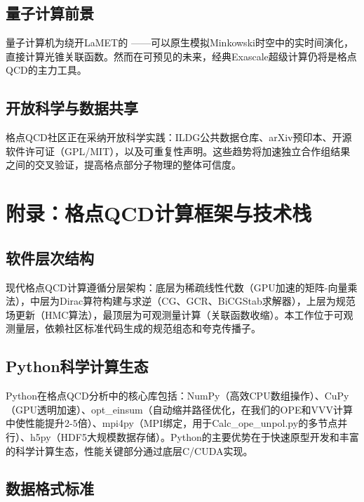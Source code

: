 \documentclass[11pt,a4paper]{ctexart}
\begin{document}
\subsection{量子计算前景}

量子计算机为绕开LaMET的 \to \infty——可以原生模拟Minkowski时空中的实时间演化，直接计算光锥关联函数。然而在可预见的未来，经典Exascale超级计算仍将是格点QCD的主力工具。

\subsection{开放科学与数据共享}

格点QCD社区正在采纳开放科学实践：ILDG公共数据仓库、arXiv预印本、开源软件许可证（GPL/MIT），以及可重复性声明。这些趋势将加速独立合作组结果之间的交叉验证，提高格点部分子物理的整体可信度。


\section{附录：格点QCD计算框架与技术栈}

\subsection{软件层次结构}

现代格点QCD计算遵循分层架构：底层为稀疏线性代数（GPU加速的矩阵-向量乘法），中层为Dirac算符构建与求逆（CG、GCR、BiCGStab求解器），上层为规范场更新（HMC算法），最顶层为可观测量计算（关联函数收缩）。本工作位于可观测量层，依赖社区标准代码生成的规范组态和夸克传播子。

\subsection{Python科学计算生态}

Python在格点QCD分析中的核心库包括：NumPy（高效CPU数组操作）、CuPy（GPU透明加速）、opt\_einsum（自动缩并路径优化，在我们的OPE和VVV计算中使性能提升2-5倍）、mpi4py（MPI绑定，用于Calc\_ope\_unpol.py的多节点并行）、h5py（HDF5大规模数据存储）。Python的主要优势在于快速原型开发和丰富的科学计算生态，性能关键部分通过底层C/CUDA实现。

\subsection{数据格式标准}
\end{document}
